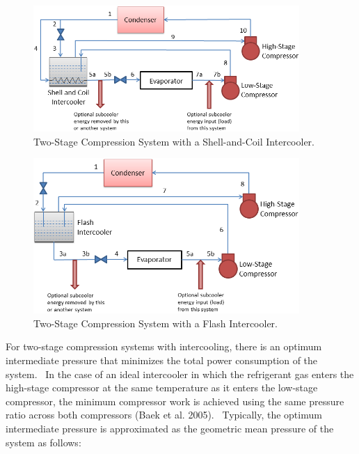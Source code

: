 \begin{figure}[hbtp] %
\centering
\includegraphics[width=0.9\textwidth, height=0.9\textheight, keepaspectratio=true]{media/image6278.png}
\caption{  Two-Stage Compression System with a Shell-and-Coil Intercooler. \protect \label{fig:two-stage-compression-system-with-a-shell}}
\end{figure}

\begin{figure}[hbtp] %
\centering
\includegraphics[width=0.9\textwidth, height=0.9\textheight, keepaspectratio=true]{media/image6279.png}
\caption{  Two-Stage Compression System with a Flash Intercooler. \protect \label{fig:two-stage-compression-system-with-a-flash}}
\end{figure}

For two-stage compression systems with intercooling, there is an optimum intermediate pressure that minimizes the total power consumption of the system.~ In the case of an ideal intercooler in which the refrigerant gas enters the high-stage compressor at the same temperature as it enters the low-stage compressor, the minimum compressor work is achieved using the same pressure ratio across both compressors (Baek et al. 2005).~ Typically, the optimum intermediate pressure is approximated as the geometric mean pressure of the system as follows:

